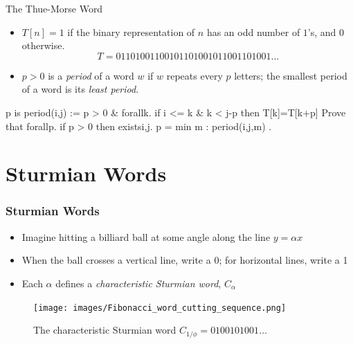 \documentclass[leqno,presentation,usenames,dvipsnames]{beamer}
\begin{document}
\begin{frame}[fragile]{The Thue-Morse Word}
    \begin{itemize}
        \item $T[n] = 1$ if the binary representation of $n$ has an odd number of $1$'s, and $0$ otherwise.
        \[
            T = 01101001100101101001011001101001\ldots
        \]
        
        \item $p > 0$ is a \emph{period} of a word $w$ if $w$ repeats every $p$ letters; the smallest period of a word is its \emph{least period}.
        
    \end{itemize}
    
\begin{pecan}
p is period(i,j) := p > 0 &
    forallk. if i <= k & k < j-p then T[k]=T[k+p]
Prove that {
    forallp. if p > 0 then 
        existsi,j. p = min { m : period(i,j,m) }
}.
\end{pecan}
\end{frame}

\section{Sturmian Words}

\begin{frame}
    \frametitle{Sturmian Words}
    
    \begin{itemize}
        \item Imagine hitting a billiard ball at some angle along the line $y = \alpha x$
        \item When the ball crosses a vertical line, write a 0; for horizontal lines, write a 1
        \item Each $\alpha$ defines a \emph{characteristic Sturmian word}, $C_{\alpha}$
    \end{itemize}
    
\begin{figure}
    \centering
    \texttt{[image: images/Fibonacci\_word\_cutting\_sequence.png]}
    \caption{The characteristic Sturmian word $C_{1/\phi} = 0100101001\ldots$}
\end{figure}
\end{frame}
\end{document}
